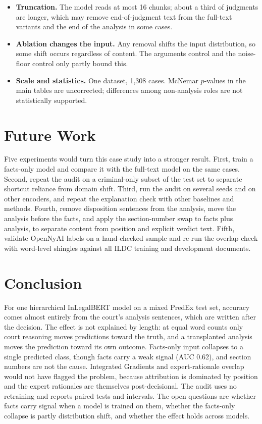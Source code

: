 \documentclass[conference]{IEEEtran}
\begin{document}
\begin{itemize}[leftmargin=*]
    \item \textbf{Truncation.} The model reads at most 16 chunks; about a third of judgments are longer, which may remove end-of-judgment text from the full-text variants and the end of the analysis in some cases.
    \item \textbf{Ablation changes the input.} Any removal shifts the input distribution, so some shift occurs regardless of content. The arguments control and the noise-floor control only partly bound this.
    \item \textbf{Scale and statistics.} One dataset, 1,308 cases. McNemar $p$-values in the main tables are uncorrected; differences among non-analysis roles are not statistically supported.
\end{itemize}

\section{Future Work}
\label{sec:future}
Five experiments would turn this case study into a stronger result. First, train a facts-only model and compare it with the full-text model on the same cases. Second, repeat the audit on a criminal-only subset of the test set to separate shortcut reliance from domain shift. Third, run the audit on several seeds and on other encoders, and repeat the explanation check with other baselines and methods. Fourth, remove disposition sentences from the analysis, move the analysis before the facts, and apply the section-number swap to facts plus analysis, to separate content from position and explicit verdict text. Fifth, validate OpenNyAI labels on a hand-checked sample and re-run the overlap check with word-level shingles against all ILDC training and development documents.

\section{Conclusion}
\label{sec:conclusion}
For one hierarchical InLegalBERT model on a mixed PredEx test set, accuracy comes almost entirely from the court's analysis sentences, which are written after the decision. The effect is not explained by length: at equal word counts only court reasoning moves predictions toward the truth, and a transplanted analysis moves the prediction toward its own outcome. Facts-only input collapses to a single predicted class, though facts carry a weak signal (AUC 0.62), and section numbers are not the cause. Integrated Gradients and expert-rationale overlap would not have flagged the problem, because attribution is dominated by position and the expert rationales are themselves post-decisional. The audit uses no retraining and reports paired tests and intervals. The open questions are whether facts carry signal when a model is trained on them, whether the facts-only collapse is partly distribution shift, and whether the effect holds across models.
\end{document}
